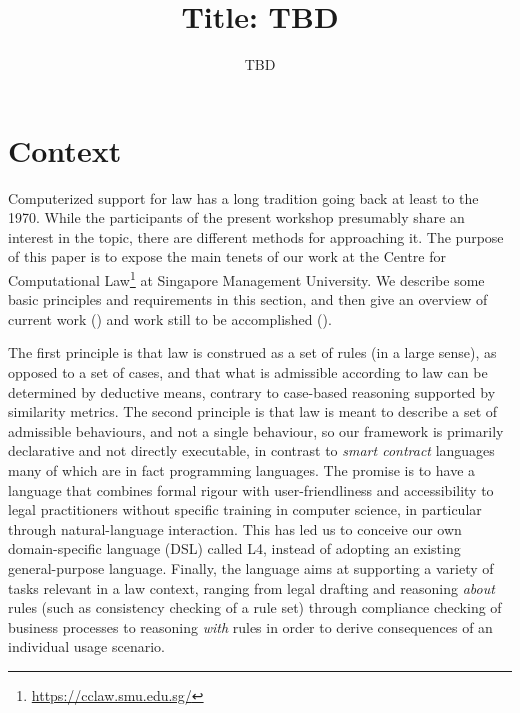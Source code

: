 \documentclass[runningheads]{llncs}
\begin{document}
\title{Title: TBD}

\author{TBD
  }
\maketitle

% 



\section{Context}\label{sec:context}

Computerized support for law has a long tradition going back at least to the
1970. While the participants of the present workshop presumably share an
interest in the topic, there are different methods for approaching it. The
purpose of this paper is to expose the main tenets of our work at the Centre
for Computational Law\footnote{\url{https://cclaw.smu.edu.sg/}} at Singapore
Management University. We describe some basic principles and requirements in
this section, and then give an overview of current work
() and work still to be accomplished
().

The first principle is that law is construed as a set of rules (in a large
sense), as opposed to a set of cases, and that what is admissible according to
law can be determined by deductive means, contrary to case-based reasoning
supported by similarity metrics. The second principle is that law is meant to
describe a set of admissible behaviours, and not a single behaviour, so our
framework is primarily declarative and not directly executable, in contrast to
\emph{smart contract} languages many of which are in fact programming
languages. The promise is to have a language that combines formal rigour with
user-friendliness and accessibility to legal practitioners without specific
training in computer science, in particular through natural-language
interaction. This has led us to conceive our own domain-specific language
(DSL) called L4, instead of adopting an existing general-purpose
language. Finally, the language aims at supporting a variety of tasks relevant
in a law context, ranging from legal drafting and reasoning \emph{about} rules
(such as consistency checking of a rule set) through compliance checking of
business processes to reasoning \emph{with} rules in order to derive
consequences of an individual usage scenario.
\end{document}
